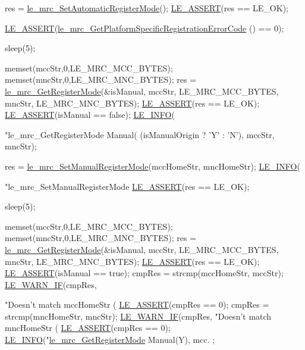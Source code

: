 \begin{DoxyCodeInclude}
{{    res = \hyperlink{le__mrc__interface_8h_acb434a9f91afb5b6639baf3678ee9388}{le\_mrc\_SetAutomaticRegisterMode}();
    \hyperlink{le__log_8h_ac0dbbef91dc0fed449d0092ff0557b39}{LE\_ASSERT}(res == LE\_OK);

    \hyperlink{le__log_8h_ac0dbbef91dc0fed449d0092ff0557b39}{LE\_ASSERT}(\hyperlink{le__mrc__interface_8h_a153247be5ea13ae2bc13ace0dd8c739c}{le\_mrc\_GetPlatformSpecificRegistrationErrorCode}
      () == 0);

    sleep(5);

    memset(mccStr,0,LE\_MRC\_MCC\_BYTES);
    memset(mncStr,0,LE\_MRC\_MNC\_BYTES);
    res = \hyperlink{le__mrc__interface_8h_a9ad2729c28e97ae450f7aee0865197f6}{le\_mrc\_GetRegisterMode}(&isManual, mccStr, LE\_MRC\_MCC\_BYTES, mncStr, 
      LE\_MRC\_MNC\_BYTES);
    \hyperlink{le__log_8h_ac0dbbef91dc0fed449d0092ff0557b39}{LE\_ASSERT}(res == LE\_OK);
    \hyperlink{le__log_8h_ac0dbbef91dc0fed449d0092ff0557b39}{LE\_ASSERT}(isManual == \textcolor{keyword}{false});
    \hyperlink{le__log_8h_a23e6d206faa64f612045d688cdde5808}{LE\_INFO}(\textcolor{stringliteral}{"le\_mrc\_GetRegisterMode Manual(%
        (isManualOrigin ? \textcolor{charliteral}{'Y'} : \textcolor{charliteral}{'N'}),
        mccStr, mncStr);

    res = \hyperlink{le__mrc__interface_8h_ac694b8aa7543eb9f058e77a844a5c0bf}{le\_mrc\_SetManualRegisterMode}(mccHomeStr, mncHomeStr);
    \hyperlink{le__log_8h_a23e6d206faa64f612045d688cdde5808}{LE\_INFO}(\textcolor{stringliteral}{"le\_mrc\_SetManualRegisterMode %
    \hyperlink{le__log_8h_ac0dbbef91dc0fed449d0092ff0557b39}{LE\_ASSERT}(res == LE\_OK);

    sleep(5);

    memset(mccStr,0,LE\_MRC\_MCC\_BYTES);
    memset(mncStr,0,LE\_MRC\_MNC\_BYTES);
    res = \hyperlink{le__mrc__interface_8h_a9ad2729c28e97ae450f7aee0865197f6}{le\_mrc\_GetRegisterMode}(&isManual, mccStr, LE\_MRC\_MCC\_BYTES, mncStr, 
      LE\_MRC\_MNC\_BYTES);
    \hyperlink{le__log_8h_ac0dbbef91dc0fed449d0092ff0557b39}{LE\_ASSERT}(res == LE\_OK);
    \hyperlink{le__log_8h_ac0dbbef91dc0fed449d0092ff0557b39}{LE\_ASSERT}(isManual == \textcolor{keyword}{true});
    cmpRes = strcmp(mccHomeStr, mccStr);
    \hyperlink{le__log_8h_a8d8f204806cd5fc0455fe3caacf1d251}{LE\_WARN\_IF}(cmpRes, \textcolor{stringliteral}{"Doesn't match mccHomeStr (%
    \hyperlink{le__log_8h_ac0dbbef91dc0fed449d0092ff0557b39}{LE\_ASSERT}(cmpRes == 0);
    cmpRes = strcmp(mncHomeStr, mncStr);
    \hyperlink{le__log_8h_a8d8f204806cd5fc0455fe3caacf1d251}{LE\_WARN\_IF}(cmpRes, "Doesn't match mncHomeStr (%
    \hyperlink{le__log_8h_ac0dbbef91dc0fed449d0092ff0557b39}{LE\_ASSERT}(cmpRes == 0);
    \hyperlink{le__log_8h_a23e6d206faa64f612045d688cdde5808}{LE\_INFO}("\hyperlink{le__mrc__interface_8h_a9ad2729c28e97ae450f7aee0865197f6}{le\_mrc\_GetRegisterMode} Manual(Y), mcc.%
      ;

}}}}}
\end{DoxyCodeInclude}
